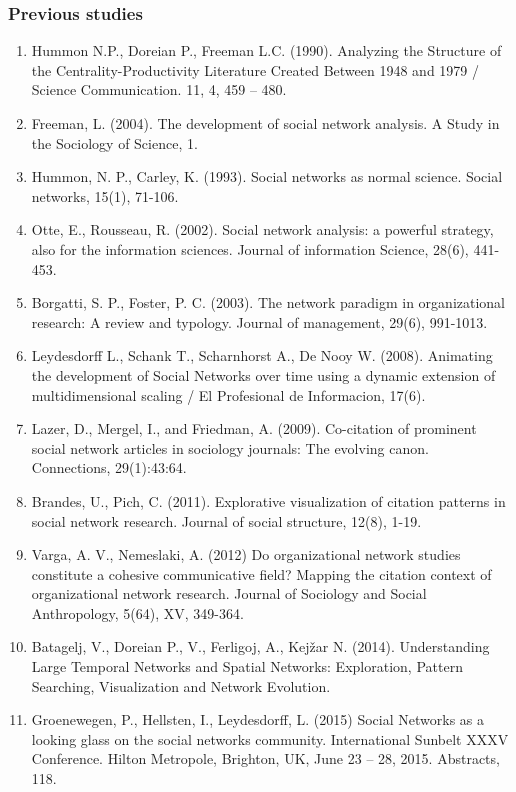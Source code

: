 \documentclass[hyperref={pdfstartview={FitBH -32768},
                         pdfpagemode=FullScreen,
                         plainpages=false,
                         colorlinks=true}
              ]{beamer}
\begin{document}
\begin{frame}[fragile]
\frametitle{Previous studies}
\tiny
\begin{enumerate}

\item Hummon N.P., Doreian P., Freeman L.C. (1990). Analyzing the Structure of the Centrality-Productivity Literature Created Between 1948 and 1979 / Science Communication. 11, 4, 459 – 480. 

\item   Freeman, L. (2004). The development of social network analysis. A Study in the Sociology of Science, 1.

\item  Hummon, N. P., Carley, K. (1993). Social networks as normal science. Social networks, 15(1), 71-106.

\item   Otte, E., Rousseau, R. (2002). Social network analysis: a powerful strategy, also for the information sciences. Journal of information Science, 28(6), 441-453. 

\item Borgatti, S. P., Foster, P. C. (2003). The network paradigm in organizational research: A review and typology. Journal of management, 29(6), 991-1013.

\item Leydesdorff L., Schank T., Scharnhorst A., De Nooy W. (2008). Animating the development of Social Networks over time using a dynamic extension of multidimensional scaling / El Profesional de Informacion, 17(6).

\item Lazer, D., Mergel, I., and Friedman, A. (2009). Co-citation of prominent social network articles in sociology journals: The evolving canon. Connections, 29(1):43:64. 

\item Brandes, U., Pich, C. (2011). Explorative visualization of citation patterns in social network research. Journal of social structure, 12(8), 1-19.

\item Varga, A. V., Nemeslaki, A. (2012) Do organizational network studies constitute a cohesive communicative field? Mapping the citation context of organizational network research. Journal of Sociology and Social Anthropology, 5(64), XV, 349-364. \

\item Batagelj, V., Doreian P., V., Ferligoj, A., Kejžar N. (2014). Understanding Large Temporal Networks and Spatial Networks: Exploration, Pattern Searching, Visualization and Network Evolution. 

\item Groenewegen, P., Hellsten, I., Leydesdorff, L. (2015) Social Networks as a looking glass on the social networks community. International Sunbelt XXXV Conference. Hilton Metropole, Brighton, UK, June 23 – 28, 2015. Abstracts, 118. 

\end{enumerate}
\end{frame}
\end{document}
